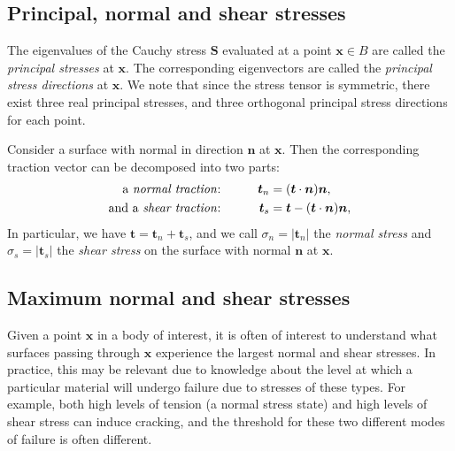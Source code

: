 \documentclass[
  letterpaper,
  DIV=11,
  numbers=noendperiod]{scrreprt}
\theoremstyle{plain}
\theoremstyle{remark}
\begin{document}
\subsection{Principal, normal and shear
stresses}\label{principal-normal-and-shear-stresses}

The eigenvalues of the Cauchy stress \({\boldsymbol{S}}\) evaluated at a
point \({\boldsymbol{x}}\in B\) are called the \emph{principal stresses}
at \({\boldsymbol{x}}\). The corresponding eigenvectors are called the
\emph{principal stress directions} at \({\boldsymbol{x}}\). We note that
since the stress tensor is symmetric, there exist three real principal
stresses, and three orthogonal principal stress directions for each
point.

Consider a surface with normal in direction \({\boldsymbol{n}}\) at
\({\boldsymbol{x}}\). Then the corresponding traction vector can be
decomposed into two parts: \[\begin{aligned}
    \text{a \emph{normal traction}:}&\qquad&{\boldsymbol{t}}_n &= ({\boldsymbol{t}}\cdot{\boldsymbol{n}}){\boldsymbol{n}},\\
    \text{and a \emph{shear traction}:}&\qquad&{\boldsymbol{t}}_s&= {\boldsymbol{t}}-({\boldsymbol{t}}\cdot{\boldsymbol{n}}){\boldsymbol{n}},
  \end{aligned}\] In particular, we have
\({\boldsymbol{t}}={\boldsymbol{t}}_n+{\boldsymbol{t}}_s\), and we call
\(\sigma_n=|{\boldsymbol{t}}_n|\) the \emph{normal stress} and
\(\sigma_s=|{\boldsymbol{t}}_s|\) the \emph{shear stress} on the surface
with normal \({\boldsymbol{n}}\) at \({\boldsymbol{x}}\).

\subsection{Maximum normal and shear
stresses}\label{maximum-normal-and-shear-stresses}

Given a point \({\boldsymbol{x}}\) in a body of interest, it is often of
interest to understand what surfaces passing through
\({\boldsymbol{x}}\) experience the largest normal and shear stresses.
In practice, this may be relevant due to knowledge about the level at
which a particular material will undergo failure due to stresses of
these types. For example, both high levels of tension (a normal stress
state) and high levels of shear stress can induce cracking, and the
threshold for these two different modes of failure is often different.
\end{document}

